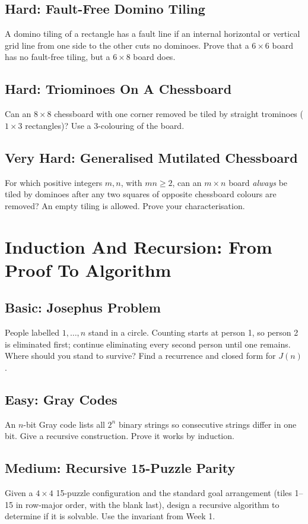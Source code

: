 \documentclass[12pt]{article}
\begin{document}
\subsection*{Hard: Fault-Free Domino Tiling}
A domino tiling of a rectangle has a fault line if an internal
horizontal or vertical grid line from one side to the other cuts no
dominoes. Prove that a $6\times6$ board has no fault-free tiling,
but a $6\times8$ board does.

\subsection*{Hard: Triominoes On A Chessboard}
Can an $8\times8$ chessboard with one corner removed be tiled by
straight trominoes ($1\times3$ rectangles)? Use a 3-colouring of the board.

\subsection*{Very Hard: Generalised Mutilated Chessboard}
For which positive integers $m,n$, with $mn\ge2$, can an $m\times n$
board \emph{always} be tiled by dominoes after any two squares of
opposite chessboard colours are removed? An empty tiling is allowed.
Prove your characterisation.

\section{Induction And Recursion: From Proof To Algorithm}

\subsection*{Basic: Josephus Problem}
People labelled $1,\ldots,n$ stand in a circle. Counting starts at
person 1, so person 2 is eliminated first; continue eliminating every
second person until one remains. Where should you stand to survive?
Find a recurrence and closed form for $J(n)$.

\subsection*{Easy: Gray Codes}
An $n$-bit Gray code lists all $2^n$ binary strings so consecutive
strings differ in one bit. Give a recursive construction. Prove it
works by induction.

\subsection*{Medium: Recursive 15-Puzzle Parity}
Given a $4\times4$ 15-puzzle configuration and the standard goal
arrangement (tiles 1--15 in row-major order, with the blank last),
design a recursive algorithm to determine if it is solvable. Use the
invariant from Week 1.
\end{document}
